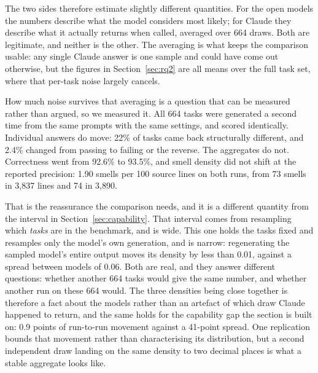 \documentclass[10pt,a4paper,twocolumn]{article}
\begin{document}
The two sides therefore estimate slightly different quantities. For the open
models the numbers describe what the model considers most likely; for Claude they
describe what it actually returns when called, averaged over 664 draws. Both are
legitimate, and neither is the other. The averaging is what keeps the comparison
usable: any single Claude answer is one sample and could have come out otherwise,
but the figures in Section~\ref{sec:rq2} are all means over the full task set,
where that per-task noise largely cancels.

How much noise survives that averaging is a question that can be measured rather
than argued, so we measured it. All 664 tasks were generated a second time from
the same prompts with the same settings, and scored identically. Individual
answers do move: 22\% of tasks came back structurally different, and 2.4\%
changed from passing to failing or the reverse. The aggregates do not.
Correctness went from 92.6\% to 93.5\%, and smell density did not shift at the
reported precision: 1.90 smells per 100 source lines on both runs, from 73
smells in 3,837 lines and 74 in 3,890.

That is the reassurance the comparison needs, and it is a different quantity from
the interval in Section~\ref{sec:capability}. That interval comes from resampling
which \emph{tasks} are in the benchmark, and is wide. This one holds the tasks
fixed and resamples only the model's own generation, and is narrow: regenerating
the sampled model's entire output moves its density by less than 0.01, against a
spread between models of 0.06. Both are real, and they answer different questions:
whether another 664 tasks would give the same number, and whether another run on
these 664 would. The
three densities being close together is therefore a fact about the models rather
than an artefact of which draw Claude happened to return, and the same holds for
the capability gap the section is built on: 0.9 points of run-to-run movement
against a 41-point spread. One replication bounds that movement rather than
characterising its distribution, but a second independent draw landing on the same
density to two decimal places is what a stable aggregate looks like.
\end{document}
